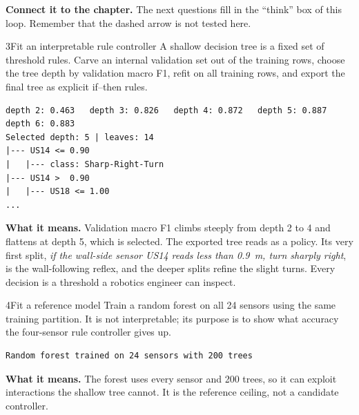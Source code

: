 \textbf{Connect it to the chapter.} The next questions fill in the ``think'' box of this loop. Remember that the dashed arrow is not tested here.


\begin{labquestion}{3}{Fit an interpretable rule controller}
A shallow decision tree is a fixed set of threshold rules. Carve an internal validation set out of the training rows, choose the tree depth by validation macro F1, refit on all training rows, and export the final tree as explicit if--then rules.
\end{labquestion}
\begin{labanswer}

\begin{refoutput}
\begin{lstlisting}[style=utpterminal]
depth 2: 0.463   depth 3: 0.826   depth 4: 0.872   depth 5: 0.887   depth 6: 0.883
Selected depth: 5 | leaves: 14
|--- US14 <= 0.90
|   |--- class: Sharp-Right-Turn
|--- US14 >  0.90
|   |--- US18 <= 1.00
...
\end{lstlisting}
\end{refoutput}

\textbf{What it means.} Validation macro F1 climbs steeply from depth 2 to 4 and flattens at depth 5, which is selected. The exported tree reads as a policy. Its very first split, \emph{if the wall-side sensor US14 reads less than 0.9~m, turn sharply right}, is the wall-following reflex, and the deeper splits refine the slight turns. Every decision is a threshold a robotics engineer can inspect.
\end{labanswer}

\begin{labquestion}{4}{Fit a reference model}
Train a random forest on all 24 sensors using the same training partition. It is not interpretable; its purpose is to show what accuracy the four-sensor rule controller gives up.
\end{labquestion}
\begin{labanswer}

\begin{refoutput}
\begin{lstlisting}[style=utpterminal]
Random forest trained on 24 sensors with 200 trees
\end{lstlisting}
\end{refoutput}

\textbf{What it means.} The forest uses every sensor and 200 trees, so it can exploit interactions the shallow tree cannot. It is the reference ceiling, not a candidate controller.
\end{labanswer}

